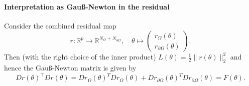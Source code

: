 \paragraph{Interpretation as Gau\ss-Newton in the residual}
Consider the combined residual map
\begin{equation*}
    r\colon\mathbb R^p\to\mathbb R^{N_\Omega+N_{\partial\Omega}}, \quad \theta \mapsto \begin{pmatrix}
        r_\Omega(\theta) \\ r_{\partial\Omega}(\theta)
    \end{pmatrix}.
\end{equation*}
Then (with the right choice of the inner product) $L(\theta) = \frac12 \lVert r(\theta) \rVert_2^2$ and hence the Gau\ss-Newton matrix is given by
\[ Dr(\theta)^\top Dr(\theta) = Dr_\Omega(\theta)^T Dr_\Omega(\theta) + Dr_{\partial\Omega}(\theta)^T Dr_{\partial\Omega}(\theta) = F(\theta). \]
